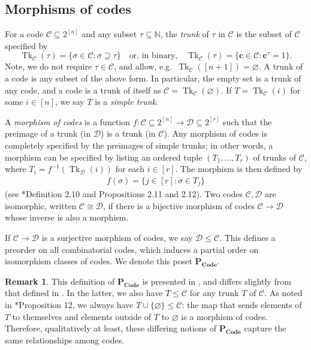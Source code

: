 \documentclass[11pt,letterpaper, reqno]{amsart}
\theoremstyle{definition}
\newtheorem{rmk}[thm]{Remark}
\DeclareMathOperator{\tk}{Tk}
\def\N{\mathbb{N}}
\def\bc{\mathbf{c}}
\def\cC{\mathcal{C}}
\def\cD{\mathcal{D}}
\def\pcode{\mathbf{P_{Code}}}
\begin{document}
    \subsection{Morphisms of codes}
        For a code $\cC \subseteq 2^{[n]}$ and any subset $\tau \subseteq \N$, the \emph{trunk} of $\tau$ in $\cC$ is the subset of $\cC$ specified by
            \[ \tk_\cC(\tau) = \{\sigma \in \cC : \sigma \supseteq \tau\} \quad \text{or, in binary,} \quad \tk_\cC(\tau) = \{\bc \in \cC : \bc^\tau = 1\}. \]
        Note, we do not require $\tau \in \cC$, and allow, e.g.\ $\tk_\cC([n+1]) = \varnothing$.
        A trunk of a code is any subset of the above form. In particular, the empty set is a trunk of any code, and a code is a trunk of itself as $\cC = \tk_\cC(\varnothing)$.
        If $T = \tk_\cC(i)$ for some $i \in [n]$, we say $T$ is a \emph{simple trunk}.
        

        A \emph{morphism of codes} is a function $f: \cC \subseteq 2^{[n]} \to \cD \subseteq 2^{[r]}$ such that the preimage of a trunk (in $\cD$) is a trunk (in $\cC$).
        Any morphism of codes is completely specified by the preimages of simple trunks; in other words, a morphism can be specified by listing an ordered tuple $(T_1,\dots,T_r)$ of trunks of $\cC$, where $T_i = f^{-1}(\tk_\cD(i))$ for each $i \in [r]$. The morphism is then defined by 
        \begin{align}
            f(\sigma) = \{ j \in [r] : \sigma \in T_j\}\label{eq:morphismtrunks}
        \end{align}
        (see \cite{morphisms}*{Definition 2.10 and Propositions 2.11 and 2.12}).
        Two codes $\cC, \cD$ are isomorphic, written $\cC \cong \cD$, if there is a bijective morphism of codes $\cC \to \cD$ whose inverse is also a morphism.
        
        If $\cC \to \cD$ is a surjective morphism of codes, we say $\cD \leq \cC$.
        This defines a preorder on all combinatorial codes, which induces a partial order on isomorphism classes of codes.
        We denote this poset $\pcode$.
        
        \begin{rmk}\label{rmk:pcode}
            This definition of $\pcode$ is presented in \cite{jeffs2021phd}, and differs slightly from that defined in \cite{morphisms}.
            In the latter, we also have $T \leq \cC$ for any trunk $T$ of $\cC$.
            As noted in \cite{jeffs2025coveringrelationsposetcombinatorial}*{Proposition 12}, we always have $T \cup \{\varnothing\} \leq \cC$: the map that sends elements of $T$ to themselves and elements outside of $T$ to $\varnothing$ is a morphism of codes.
            Therefore, qualitatively at least, these differing notions of $\pcode$ capture the same relationships among codes.
        \end{rmk}
    
\end{document}
